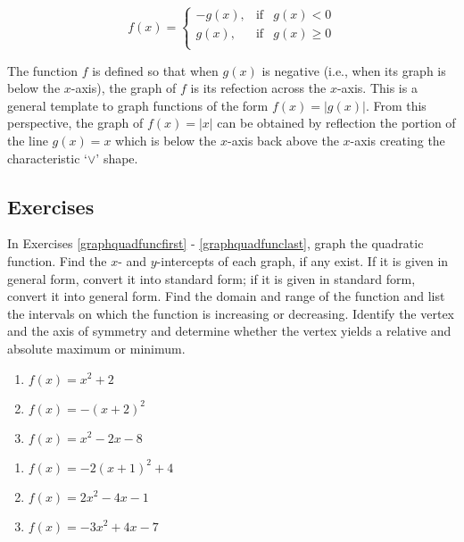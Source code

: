 \setlength{\extrarowheight}{0pt}
\[ f(x) = \left\{ \begin{array}{rcl} -g(x), & \mbox{if} & g(x) < 0  \\ g(x), & \mbox{if} & g(x) \geq 0 \\ \end{array} \right.\]
\setlength{\extrarowheight}{2pt}

The function $f$ is defined so that when $g(x)$ is negative (i.e., when its graph is below the $x$-axis), the graph of $f$ is its refection across the $x$-axis.   This is a general template to graph functions of the form $f(x) = |g(x)|$.  From this perspective, the graph of $f(x) = |x|$ can be obtained by reflection the portion of the line $g(x) =x$ which is below the $x$-axis back above the $x$-axis creating the characteristic `$\vee$' shape.  

\newpage

\subsection{Exercises}

In Exercises \ref{graphquadfuncfirst} - \ref{graphquadfunclast}, graph the quadratic function.  Find the $x$- and $y$-intercepts of each graph, if any exist.  If it is given in general form, convert it into standard form; if it is given in standard form, convert it into general form.  Find the domain and range of the function and list the intervals on which the function is increasing or decreasing.  Identify the vertex and the axis of symmetry and determine whether the vertex yields a relative and absolute maximum or minimum.

\begin{multicols}{3}
\begin{enumerate}

\item $f(x) = x^{2} + 2$ \label{graphquadfuncfirst}
\item $f(x) = -(x + 2)^{2}$
\item $f(x) = x^{2} - 2x - 8$

\setcounter{HW}{\value{enumi}}
\end{enumerate}
\end{multicols}

\begin{multicols}{3}
\begin{enumerate}
\setcounter{enumi}{\value{HW}}

\item $f(x) = -2(x + 1)^{2} + 4$
\item $f(x) = 2x^2 - 4x - 1$
\item $f(x) = -3x^{2} + 4x - 7$

\setcounter{HW}{\value{enumi}}
\end{enumerate}
\end{multicols}


